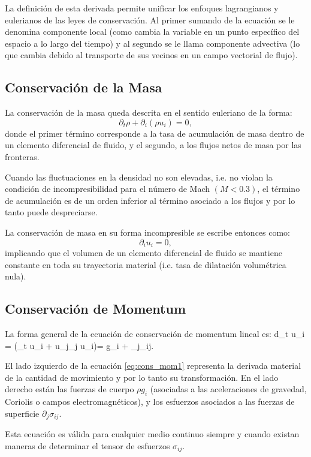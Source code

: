 La definición de esta derivada permite unificar los enfoques lagrangianos y eulerianos de las leyes de conservación. Al primer sumando de la ecuación se le denomina componente local (como cambia la variable en un punto específico del espacio a lo largo del tiempo) y al segundo se le llama componente advectiva (lo que cambia debido al transporte de sus vecinos en un campo vectorial de flujo).
\subsection{Conservación de la Masa}
La conservación de la masa queda descrita en el sentido euleriano de la forma:
\begin{equation}\label{eq:cons_masa}
\partial_t \rho + \partial_i(\rho u_i) = 0,
\end{equation}
donde el primer término corresponde a la tasa de acumulación de masa dentro de un elemento diferencial de fluido, y el segundo, a los flujos netos de masa por las fronteras.

Cuando las fluctuaciones en la densidad no son elevadas, i.e. no violan la condición de incompresibilidad para el número de Mach $(M<0.3)$, el término de acumulación es de un orden inferior al término asociado a los flujos y por lo tanto puede despreciarse.

La conservación de masa en su forma incompresible se escribe entonces como:
\begin{equation}
\partial_i u_i =0,
\end{equation}
implicando que el volumen de un elemento diferencial de fluido se mantiene constante en toda su trayectoria material (i.e. tasa de dilatación volumétrica nula).
\subsection{Conservación de Momentum}
La forma general de la ecuación de conservación de momentum lineal es:
\be\label{eq:cons_mom1}
\rho d_t u_i = \rho(\partial_t u_i + u_j\partial_j u_i)= \rho g_i + \partial_j\sigma_{ij}.
\ee

El lado izquierdo de la ecuación \ref{eq:cons_mom1} representa la derivada material de la cantidad de movimiento y por lo tanto su transformación. En el lado derecho están las fuerzas de cuerpo $\rho g_i$ (asociadas a las aceleraciones de gravedad, Coriolis o campos electromagnéticos), y los esfuerzos asociados a las fuerzas de superficie $\partial_j \sigma_{ij}$. 

Esta ecuación es válida para cualquier medio continuo siempre y cuando existan maneras de determinar el tensor de esfuerzos $\sigma_{ij}$.

